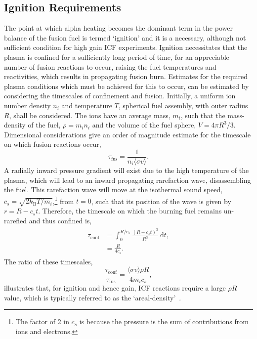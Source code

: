 \subsection{Ignition Requirements}%
\label{sec:intro_icf_ignition}

The point at which alpha heating becomes the dominant term in the power balance of the fusion fuel is termed `ignition' and it is a necessary, although not sufficient condition for high gain \ac{ICF} experiments.
Ignition necessitates that the plasma is confined for a sufficiently long period of time, for an appreciable number of fusion reactions to occur, raising the fuel temperatures and reactivities, which results in propagating fusion burn.
Estimates for the required plasma conditions which must be achieved for this to occur, can be estimated by considering the timescales of confinement and fusion.
Initially, a uniform ion number density $n_i$ and temperature $T$, spherical fuel assembly, with outer radius $R$, shall be considered.
The ions have an average mass, $m_i$, such that the mass-density of the fuel, $\rho = m_i n_i$ and the volume of the fuel sphere, $V = 4\pi R^3/3$.
Dimensional considerations give an order of magnitude estimate for the timescale on which fusion reactions occur,
\begin{equation}
    \tau_{\text{fus}} = \frac{1}{n_i \langle \sigma v \rangle}.
\end{equation}
A radially inward pressure gradient will exist due to the high temperature of the plasma, which will lead to an inward propagating rarefaction wave, disassembling the fuel.
This rarefaction wave will move at the isothermal sound speed, $c_s=\sqrt{2k_{\text{B}}T/m_i}$,\footnote{The factor of 2 in $c_s$ is because the pressure is the sum of contributions from ions and electrons.} from $t=0$, such that its position of the wave is given by $r=R-c_s t$.
Therefore, the timescale on which the burning fuel remains un-rarefied and thus confined is,
\begin{align}
    \begin{split}
        \tau_{\text{conf}} &= \int_0^{R/c_s} \frac{ {(R - c_s t)}^3 }{R^3} \ \text{d}t,\\
        &= \frac{R}{4 c_s}.
    \end{split}
\end{align}
The ratio of these timescales,
\begin{equation}
    \frac{\tau_{\text{conf}}}{\tau_{\text{fus}}} = \frac{\langle \sigma v \rangle \rho R}{4 m_i c_s},
\end{equation}
illustrates that, for ignition and hence gain, \ac{ICF} reactions require a large $\rho R$ value, which is typically referred to as the `areal-density'~\cite{fraley_thermonuclear_1974}.

